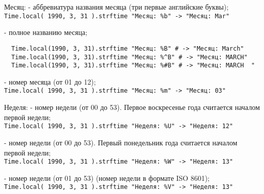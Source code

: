 \begin{keylist}{Месяц:}
   - аббревиатура названия месяца (три первые английские буквы);   
  \\\verb!Time.local( 1990, 3, 31 ).strftime "Месяц: %b" -> "Месяц: Mar"!    
  
   - полное названию месяца;
  \begin{verbatim}
  Time.local(1990, 3, 31).strftime "Месяц: %B" # -> "Месяц: March"
  Time.local(1990, 3, 31).strftime "Месяц: %^B" # -> "Месяц: MARCH"
  Time.local(1990, 3, 31).strftime "Месяц: %#B" # -> "Месяц: MARCH  "
  \end{verbatim}    
   
   - номер месяца (от 01 до 12);  
  \\\verb!Time.local( 1990, 3, 31 ).strftime "Месяц: %m" -> "Месяц: 03"!
\end{keylist}

\begin{keylist}{Неделя:}
   - номер недели (от 00 до 53). Первое воскресенье года считается началом первой недели;  
  \\\verb!Time.local( 1990, 3, 31 ).strftime "Неделя: %U" -> "Неделя: 12"! 
   
   - номер недели (от 00 до 53). Первый понедельник года считается началом первой недели;  
  \\\verb!Time.local( 1990, 3, 31 ).strftime "Неделя: %W" -> "Неделя: 13"! 
   
   - номер недели (от 01 до 53) (номер недели в формате ISO 8601);  
  \\\verb!Time.local( 1990, 3, 31 ).strftime "Неделя: %V" -> "Неделя: 13"! 
\end{keylist}

